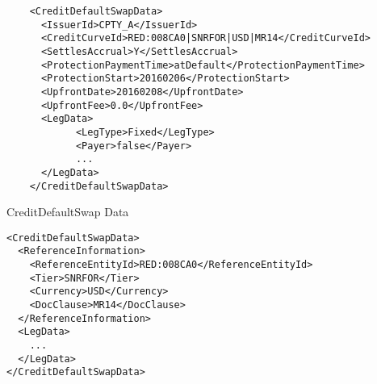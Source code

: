 \begin{listing}[H]
\begin{verbatim}
    <CreditDefaultSwapData>
      <IssuerId>CPTY_A</IssuerId>
      <CreditCurveId>RED:008CA0|SNRFOR|USD|MR14</CreditCurveId>
      <SettlesAccrual>Y</SettlesAccrual>
      <ProtectionPaymentTime>atDefault</ProtectionPaymentTime>
      <ProtectionStart>20160206</ProtectionStart>
      <UpfrontDate>20160208</UpfrontDate>
      <UpfrontFee>0.0</UpfrontFee>
      <LegData>
            <LegType>Fixed</LegType>
            <Payer>false</Payer>
            ...
      </LegData>
    </CreditDefaultSwapData>
\end{verbatim}
\caption{CreditDefaultSwap Data}
\label{lst:cdsdata}
\end{listing}

\begin{listing}[H]
\begin{verbatim}
<CreditDefaultSwapData>
  <ReferenceInformation>
    <ReferenceEntityId>RED:008CA0</ReferenceEntityId>
    <Tier>SNRFOR</Tier>
    <Currency>USD</Currency>
    <DocClause>MR14</DocClause>
  </ReferenceInformation>
  <LegData>
    ...
  </LegData>
</CreditDefaultSwapData>
\end{verbatim}
\caption{\lstinline!CreditDefaultSwapData! with \lstinline!ReferenceInformation!}
\label{lst:cdsdata_with_ref_info}
\end{listing}
